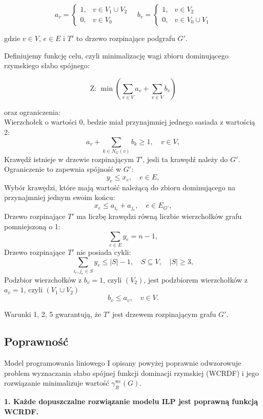 \[
a_v =
\begin{cases}
1, & v \in V_1 \cup V_2 \\
0, & v \in V_0
\end{cases}
\quad
b_v =
\begin{cases}
1, & v \in V_2 \\
0, & v \in V_0 \cup V_1
\end{cases}
\]

gdzie \( v \in V \), \( e \in E \) i \( T' \) to drzewo rozpinające podgrafu \( G' \).

Definiujemy funkcję celu, czyli minimalizację wagi zbioru dominującego rzymskiego słabo spójnego:

\[
\text{Z: } \min \left( \sum_{v \in V} a_v + \sum_{v \in V} b_v \right)
\]

oraz ograniczenia:\\
Wierzchołek o wartości 0, bedzie miał przynajmniej jednego sasiada z wartością 2:
\[
    a_v + \sum_{k \in N_G(v)} b_k \geq 1, \quad v \in V, \tag{1}
\]
Krawędź istnieje w drzewie rozpinającym \( T' \), jesli ta krawędź należy do \( G' \). Ograniczenie to zapewnia spójność w \( G' \):
\[
    y_e \leq x_e, \quad e \in E, \tag{2}
\]
Wybór krawędzi, które mają  wartość należącą do zbioru dominującego na przynajmniej jednym swoim końcu:
\[
    x_e \leq a_{i_e} + a_{j_e}, \quad e \in E_{G'}, \tag{3}
\]
Drzewo rozpinające \( T' \) ma liczbę krawędzi równą liczbie wierzchołków grafu pomniejszoną o 1:
\[
    \sum_{e \in E} y_e = n - 1, \tag{4}
\]
Drzewo rozpinające \( T' \) nie posiada cykli:
\[
    \sum_{i_e, j_e \in S} y_e \leq |S| - 1, \quad S \subseteq V, \quad |S| \geq 3, \tag{5}
\]
Podzbior wierzchołków z $b_v = 1$, czyli $(V_2)$, jest podzbiorem wierzchołków z $a_v = 1$, czyli $(V_1 \cup V_2)$
\[
    b_v \leq a_v, \quad v \in V. \tag{6}
\]

Warunki 1, 2, 5 gwarantują, że \( T' \) jest drzewem rozpinającym grafu \( G' \).

\subsection{Poprawność}

Model programowania liniowego I opisany powyżej poprawnie odwzorowuje problem wyznaczania słabo spójnej funkcji dominacji rzymskiej (WCRDF) i jego rozwiązanie minimalizuje wartość $\gamma_R^{\text{wc}}(G)$.

\textbf{1. Każde dopuszczalne rozwiązanie modelu ILP jest poprawną funkcją WCRDF.}

